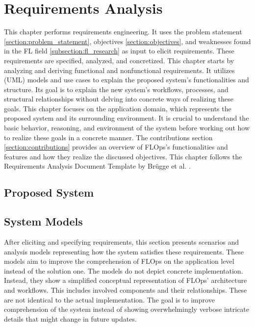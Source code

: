 \chapter{Requirements Analysis}

This chapter performs requirements engineering.
It uses the problem statement \ref{section:problem_statement}, objectives \ref{section:objectives}, and weaknesses found in the FL field \ref{subsection:fl_research} as input to elicit requirements.
These requirements are specified, analyzed, and concretized. 
This chapter starts by analyzing and deriving functional and nonfunctional requirements.
It utilizes (UML) models and use cases to explain the proposed system's functionalities and structure.
Its goal is to explain the new system's workflows, processes, and structural relationships without delving into concrete ways of realizing these goals.
This chapter focuses on the application domain, which represents the proposed system and its surrounding environment.
It is crucial to understand the basic behavior, reasoning, and environment of the system before working out how to realize these goals in a concrete manner.
The contributions section \ref{section:contributions} provides an overview of FLOps's functionalities and features and how they realize the discussed objectives.
This chapter follows the Requirements Analysis Document Template by Brügge et al. \cite{book:bruegge}.

\section{Proposed System}





\section{System Models}

After eliciting and specifying requirements, this section presents scenarios and analysis models representing how the system satisfies these requirements.
These models aim to improve the comprehension of FLOps on the application level instead of the solution one.
The models do not depict concrete implementation.
Instead, they show a simplified conceptual representation of FLOps' architecture and workflows.
This includes involved components and their relationships.
These are not identical to the actual implementation.
The goal is to improve comprehension of the system instead of showing overwhelmingly verbose intricate details that might change in future updates.









